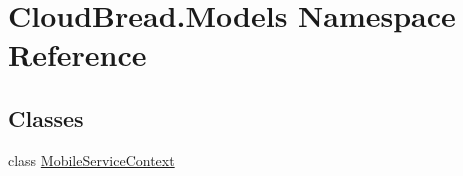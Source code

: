 \hypertarget{namespace_cloud_bread_1_1_models}{}\section{Cloud\+Bread.\+Models Namespace Reference}
\label{namespace_cloud_bread_1_1_models}
\subsection*{Classes}
\begin{DoxyCompactItemize}
\item 
class \hyperlink{class_cloud_bread_1_1_models_1_1_mobile_service_context}{Mobile\+Service\+Context}
\end{DoxyCompactItemize}
